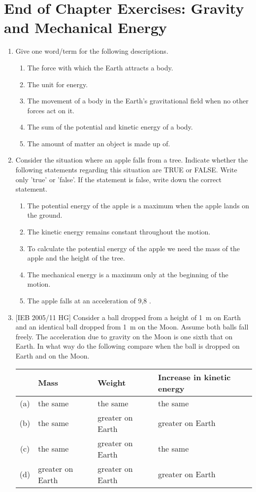 \section{End of Chapter Exercises: Gravity and Mechanical Energy}
\begin{enumerate}
\item Give one word/term for the following descriptions.
	\begin{enumerate}
	\item The force with which the Earth attracts a body.
	\item The unit for energy.
	\item The movement of a body in the Earth's gravitational field when no other forces act on it.
	\item The sum of the potential and kinetic energy of a body.
	\item The amount of matter an object is made up of.
	\end{enumerate}

\item Consider the situation where an apple falls from a tree. Indicate whether the following statements regarding this situation are TRUE or FALSE. Write only 'true' or 'false'. If the statement is false, write down the correct statement.
	\begin{enumerate}
	\item The potential energy of the apple is a maximum when the apple lands on the ground.
	\item The kinetic energy remains constant throughout the motion.
	\item To calculate the potential energy of the apple we need the mass of the apple and the height of the tree.
	\item The mechanical energy is a maximum only at the beginning of the motion.
	\item The apple falls at an acceleration of 9,8 \mss.
	\end{enumerate}
	
\item{[IEB 2005/11 HG] Consider a ball dropped from a height of 1~m on Earth and an identical ball dropped from 1~m on the Moon. Assume both balls fall freely. The acceleration due to gravity on the Moon is one sixth that on Earth. In what way do the following compare when the ball is dropped on Earth and on the Moon.
\begin{center}
\begin{tabular}{|c|l|l|l|}\hline
&\textbf{Mass}&\textbf{Weight}&\textbf{Increase in kinetic energy}\\\hline
(a)&the same&the same&the same\\\hline
(b)&the same&greater on Earth&greater on Earth\\\hline
(c)&the same&greater on Earth&the same\\\hline
(d)&greater on Earth&greater on Earth&greater on Earth\\\hline
\end{tabular}
\end{center}}


\end{enumerate}
